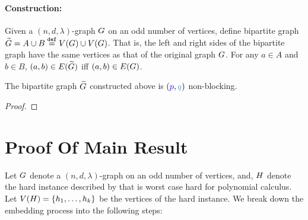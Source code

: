 \documentclass[11pt]{article}
\newcommand{\EnDeeLambda}{(n, d, \lambda)}
\begin{document}
\paragraph{Construction:} Given a $\EnDeeLambda$-graph $G$ on an odd number of vertices, define bipartite graph $\widetilde{G}  = A \cup B \overset{\mathtt{def}}{=} V(G) \cup V(G)$.
That is, the left and right sides of the bipartite graph have the same vertices as that of the original graph $G$.
For any $a \in A$ and $b \in B$, $(a,b) \in E(\widetilde{G})$ iff $(a,b) \in E(G)$.

\begin{lemma}\label{lemma: bipartite-construct-non-block}
The bipartite graph $\widetilde{G}$ constructed above is $(\pee, \qu)$ non-blocking.
\end{lemma}

\begin{proof}
	
\end{proof}

\section{Proof Of Main Result}


Let $G$ denote a $\EnDeeLambda$-graph on an odd number of vertices, and,  $H$ denote the hard instance described by  that is worst case hard for polynomial calculus.
Let $V(H) = \left\{ h_1, \dots, h_k\right\}$ be the vertices of the hard instance.
We break down the embedding process into the following steps:
\end{document}

